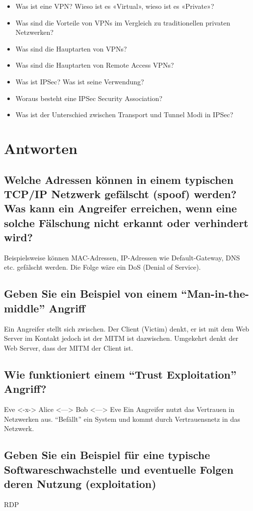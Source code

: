 \begin{itemize}
    \item Was ist eine VPN? Wieso ist es «Virtual», wieso ist es «Private»?
    \item Was sind die Vorteile von VPNs im Vergleich zu traditionellen privaten Netzwerken?
    \item Was sind die Hauptarten von VPNs?
    \item Was sind die Hauptarten von Remote Access VPNs?
    \item Was ist IPSec? Was ist seine Verwendung?
    \item Woraus besteht eine IPSec Security Association?
    \item Was ist der Unterschied zwischen Transport und Tunnel Modi in IPSec?
\end{itemize}

\section{Antworten}
\subsection*{Welche Adressen können in einem typischen TCP/IP Netzwerk gefälscht (spoof) werden? Was kann ein Angreifer erreichen, wenn eine solche Fälschung nicht erkannt oder verhindert wird?}
Beispielsweise können MAC-Adressen, IP-Adressen wie Default-Gateway, DNS etc. gefälscht werden. Die Folge wäre ein DoS (Denial of Service).

\subsection*{Geben Sie ein Beispiel von einem "`Man-in-the-middle"' Angriff}
Ein Angreifer stellt sich zwischen. Der Client (Victim) denkt, er ist mit dem Web Server im Kontakt jedoch ist der MITM ist dazwischen. Umgekehrt denkt der Web Server, dass der MITM der Client ist.

\subsection*{Wie funktioniert einem "`Trust Exploitation"' Angriff?}
Eve <-x-> Alice <---> Bob <---> Eve
Ein Angreifer nutzt das Vertrauen in Netzwerken aus. "`Befällt"' ein System und kommt durch Vertrauensnetz in das Netzwerk.

\subsection*{Geben Sie ein Beispiel für eine typische Softwareschwachstelle und eventuelle Folgen deren Nutzung (exploitation)}
RDP

